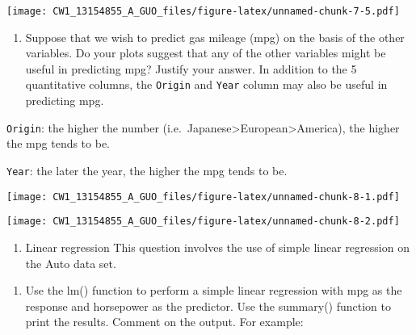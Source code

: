 \documentclass[]{article}
\newenvironment{Shaded}{\begin{snugshade}}{\end{snugshade}}
\newcommand{\KeywordTok}[1]{\textcolor[rgb]{0.13,0.29,0.53}{\textbf{#1}}}
\newcommand{\OperatorTok}[1]{\textcolor[rgb]{0.81,0.36,0.00}{\textbf{#1}}}
\newcommand{\NormalTok}[1]{#1}
\providecommand{\tightlist}{%
  \setlength{\itemsep}{0pt}\setlength{\parskip}{0pt}}
\begin{document}
\texttt{[image: CW1\_13154855\_A\_GUO\_files/figure-latex/unnamed-chunk-7-5.pdf]}

\begin{enumerate}
\def\labelenumi{(\alph{enumi})}
\setcounter{enumi}{5}
\tightlist
\item
  Suppose that we wish to predict gas mileage (mpg) on the basis of the
  other variables. Do your plots suggest that any of the other variables
  might be useful in predicting mpg? Justify your answer. In addition to
  the 5 quantitative columns, the \texttt{Origin} and \texttt{Year}
  column may also be useful in predicting mpg.
\end{enumerate}

\texttt{Origin}: the higher the number
(i.e.~Japanese\textgreater{}European\textgreater{}America), the higher
the mpg tends to be.

\texttt{Year}: the later the year, the higher the mpg tends to be.

\begin{Shaded}
\end{Shaded}

\texttt{[image: CW1\_13154855\_A\_GUO\_files/figure-latex/unnamed-chunk-8-1.pdf]}

\begin{Shaded}
\end{Shaded}

\texttt{[image: CW1\_13154855\_A\_GUO\_files/figure-latex/unnamed-chunk-8-2.pdf]}

\begin{enumerate}
\def\labelenumi{\arabic{enumi}.}
\setcounter{enumi}{3}
\tightlist
\item
  Linear regression This question involves the use of simple linear
  regression on the Auto data set.
\end{enumerate}

\begin{enumerate}
\def\labelenumi{(\alph{enumi})}
\tightlist
\item
  Use the lm() function to perform a simple linear regression with mpg
  as the response and horsepower as the predictor. Use the summary()
  function to print the results. Comment on the output. For example:
\end{enumerate}
\end{document}
